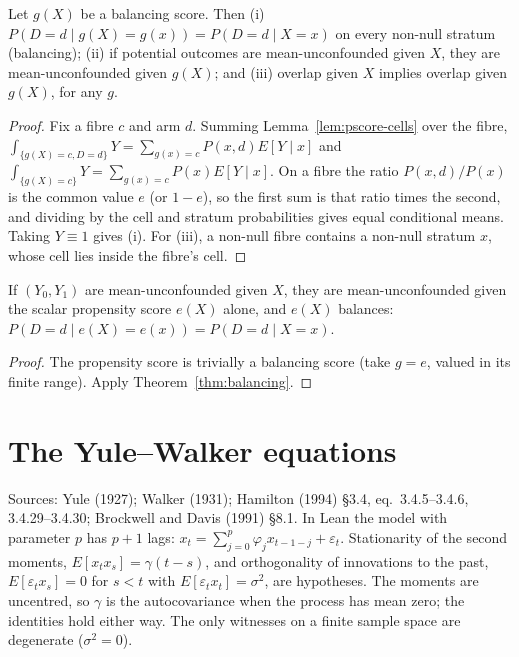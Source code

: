 \begin{theorem}
\label{thm:balancing}
\leanok
{}
Let $g(X)$ be a balancing score. Then (i) $P(D = d\mid g(X) = g(x)) = P(D = d\mid X = x)$ on every non-null stratum
(balancing); (ii) if potential outcomes are mean-unconfounded given $X$, they are mean-unconfounded given $g(X)$; and
(iii) overlap given $X$ implies overlap given $g(X)$, for any $g$.
\end{theorem}
\begin{proof}
\leanok
Fix a fibre $c$ and arm $d$. Summing Lemma~\ref{lem:pscore-cells} over the fibre,
$\int_{\{g(X)=c,D=d\}}Y = \sum_{g(x)=c}P(x,d)E[Y\mid x]$ and $\int_{\{g(X)=c\}}Y = \sum_{g(x)=c}P(x)E[Y\mid x]$. On a
fibre the ratio $P(x,d)/P(x)$ is the common value $e$ (or $1-e$), so the first sum is that ratio times the second, and
dividing by the cell and stratum probabilities gives equal conditional means. Taking $Y\equiv1$ gives (i). For
(iii), a non-null fibre contains a non-null stratum $x$, whose cell lies inside the fibre's cell.
\end{proof}

\begin{theorem}
\label{thm:rosenbaum-rubin}
\leanok
{}
If $(Y_0, Y_1)$ are mean-unconfounded given $X$, they are mean-unconfounded given the scalar propensity score $e(X)$
alone, and $e(X)$ balances: $P(D = d\mid e(X) = e(x)) = P(D = d\mid X = x)$.
\end{theorem}
\begin{proof}
\leanok
The propensity score is trivially a balancing score (take $g = e$, valued in its finite range). Apply
Theorem~\ref{thm:balancing}.
\end{proof}

\section{The Yule--Walker equations}
\label{sec:yule-walker}

Sources: Yule (1927); Walker (1931); Hamilton (1994) \S3.4, eq.~3.4.5--3.4.6, 3.4.29--3.4.30; Brockwell and Davis (1991)
\S8.1. In Lean the model with parameter $p$ has $p+1$ lags: $x_t = \sum_{j=0}^{p}\varphi_jx_{t-1-j} + \varepsilon_t$.
Stationarity of the second moments, $E[x_tx_s] = \gamma(t-s)$, and orthogonality of innovations to the past,
$E[\varepsilon_tx_s] = 0$ for $s<t$ with $E[\varepsilon_tx_t] = \sigma^2$, are hypotheses. The moments are uncentred, so
$\gamma$ is the autocovariance when the process has mean zero; the identities hold either way. The only witnesses on a
finite sample space are degenerate ($\sigma^2 = 0$).

